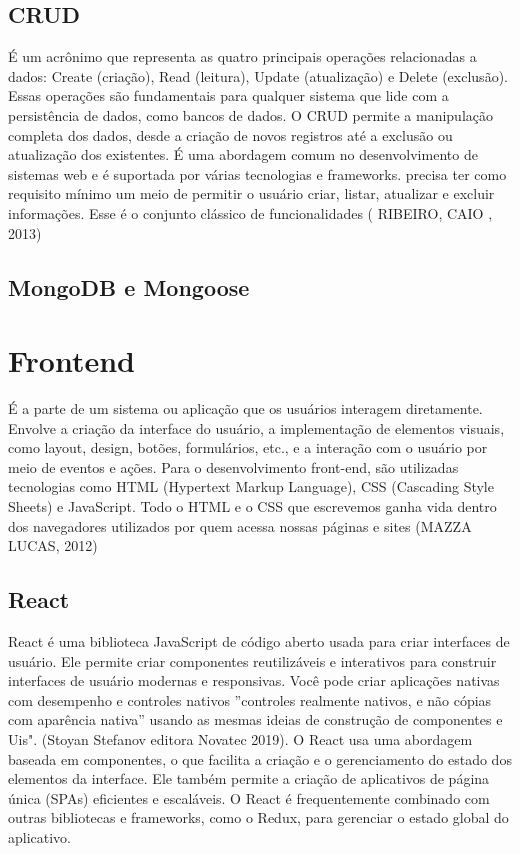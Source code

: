\subsection{CRUD}
É um acrônimo que representa as quatro principais operações relacionadas a dados: Create (criação), Read (leitura), Update (atualização) e Delete (exclusão). Essas operações são fundamentais para qualquer sistema que lide com a persistência de dados, como bancos de dados. O CRUD permite a manipulação completa dos dados, desde a criação de novos registros até a exclusão ou atualização dos existentes. É uma abordagem comum no desenvolvimento de sistemas web e é suportada por várias tecnologias e frameworks.  precisa ter como requisito mínimo um meio de permitir o usuário criar, listar, atualizar e excluir informações. Esse é o conjunto clássico de funcionalidades ( RIBEIRO, CAIO , 2013)

\subsection{MongoDB e Mongoose}


\section{Frontend}
É a parte de um sistema ou aplicação que os usuários interagem diretamente. Envolve a criação da interface do usuário, a implementação de elementos visuais, como layout, design, botões, formulários, etc., e a interação com o usuário por meio de eventos e ações. Para o desenvolvimento front-end, são utilizadas tecnologias como HTML (Hypertext Markup Language), CSS (Cascading Style Sheets) e JavaScript. Todo o HTML e o CSS que escrevemos ganha vida dentro dos navegadores utilizados por quem acessa nossas páginas e sites (MAZZA LUCAS, 2012)

\subsection{React}
React é uma biblioteca JavaScript de código aberto usada para criar interfaces de usuário. Ele permite criar componentes reutilizáveis e interativos para construir interfaces de usuário modernas e responsivas.  Você pode criar aplicações nativas com desempenho e controles
nativos ''controles realmente nativos, e não cópias com aparência nativa'' usando as mesmas ideias de construção de componentes e Uis". (Stoyan Stefanov editora Novatec 2019).
O React usa uma abordagem baseada em componentes, o que facilita a criação e o gerenciamento do estado dos elementos da interface. Ele também permite a criação de aplicativos de página única (SPAs) eficientes e escaláveis. O React é frequentemente combinado com outras bibliotecas e frameworks, como o Redux, para gerenciar o estado global do aplicativo. 

